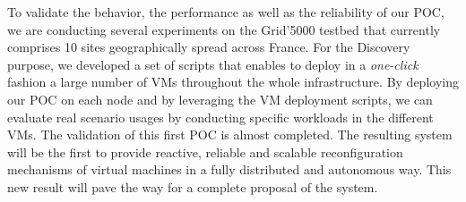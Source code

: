 %
To validate the behavior, the performance as well as the reliability of our
POC, we are conducting several experiments on the Grid'5000 testbed that currently comprises 10 sites geographically spread across France. 
For the Discovery purpose, we developed a set of scripts that enables to deploy in a \emph{one-click} fashion a large number of VMs throughout 
the whole infrastructure\cite{flauncher}. 
By deploying our POC on each node and by
leveraging the VM deployment scripts, we can evaluate real scenario usages by conducting specific workloads in the different VMs. 
The validation of this first POC is almost completed. 
The resulting system will be the first to provide reactive,
reliable and scalable
reconfiguration mechanisms of virtual machines in a fully distributed and
autonomous way. This new result will pave the way for a complete proposal of
the \discovery system. 



